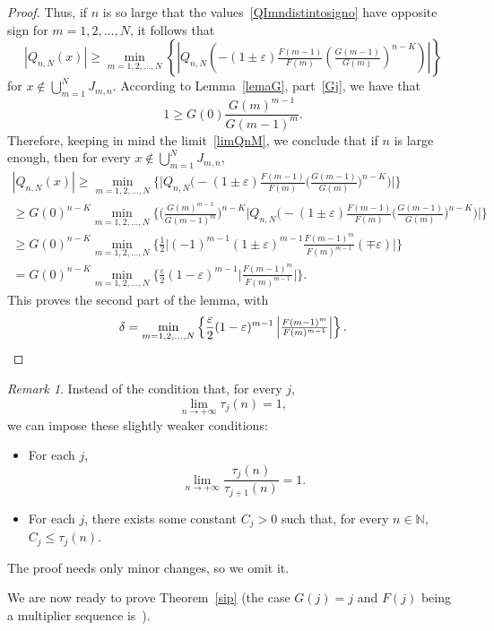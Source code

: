 \documentclass[10pt, a4paper, leqno]{amsart}
\numberwithin{equation}{section}
\theoremstyle{plain}
\theoremstyle{remark}
\newtheorem{Rem}{Remark}[section]
\newcommand{\NN}{\mathbb{N}}
\newcommand{\eps}{\varepsilon}
\begin{document}
\begin{proof}
Thus, if $n$ is so large that the values~\eqref{QImndistintosigno} have opposite sign for $m=1,2,\dots,N$, it follows that
\[
  |Q_{n,N}(x)| \ge \min_{m=1,2,\dots,N}\left\{
  \left|Q_{n,N}\left( -(1\pm \eps) \tfrac{F(m-1)}{F(m)} 
  \left( \tfrac{G(m-1)}{G(m)} \right)^{n-K} \right)\right|
  \right\}
\]
for $x \notin \bigcup_{m=1}^N J_{m,n}$. According to Lemma~\ref{lemaG}, part~\eqref{Gj},
we have that
\[
  1 \ge G(0) \frac{G(m)^{m-1}}{G(m-1)^m}.
\]
Therefore, keeping in mind the limit~\eqref{limQnM}, we conclude that if $n$ is large enough, then for every $x \notin \bigcup_{m=1}^N J_{m,n}$,
\begin{multline*}
  |Q_{n,N}(x)| \ge \min_{m=1,2,\dots,N}\Big\{
  \Big|Q_{n,N}\Big( -(1\pm \eps) \tfrac{F(m-1)}{F(m)} \Big( \tfrac{G(m-1)}{G(m)} \Big)^{n-K} \Big)\Big|
  \Big\}
  \\
  \ge G(0)^{n-K} \min_{m=1,2,\dots,N}\Big\{
  \Big( \tfrac{G(m)^{m-1}}{G(m-1)^m} \Big)^{n-K}
  \Big| Q_{n,N}\Big( -(1\pm \eps) \tfrac{F(m-1)}{F(m)} 
  \Big( \tfrac{G(m-1)}{G(m)} \Big)^{n-K} \Big)\Big|
  \Big\}
  \\
  \ge G(0)^{n-K} \min_{m=1,2,\dots,N}\Big\{
  \frac{1}{2} \Big|
  (-1)^{m-1} (1\pm \eps)^{m-1} \tfrac{F(m-1)^m}{F(m)^{m-1}}
  (\mp \eps)
  \Big|
  \Big\}
  \\
  = G(0)^{n-K} \min_{m=1,2,\dots,N} \Big\{ \frac{\eps}{2} (1 - \eps)^{m-1} 
  \Big|\tfrac{F(m-1)^m}{F(m)^{m-1}} \Big| \Big\}.
\end{multline*}
This proves the second part of the lemma, with
\[
  \delta = \min_{m=1,2,\dots,N} \left\{
  \frac{\eps}{2} (1 - \eps)^{m-1} \left|\tfrac{F(m-1)^m}{F(m)^{m-1}}\right|
  \right\}.
  \qedhere
\]
\end{proof}

\begin{Rem}
\label{taumenos}
Instead of the condition that, for every $j$,
\[
  \lim_{n \to +\infty} \tau_j(n) = 1,
\]
we can impose these slightly weaker conditions:
\begin{itemize}
\item For each $j$,
\[
  \lim_{n\to+\infty} \frac{\tau_j(n)}{\tau_{j+1}(n)} = 1.
\]
\item For each $j$, there exists some constant $C_j > 0$ such that, for every $n \in \NN$, $C_j \le \tau_j(n)$.
\end{itemize}
The proof needs only minor changes, so we omit it.
\end{Rem}

We are now ready to prove Theorem~\ref{sip} (the case $G(j)=j$ and $F(j)$ being a multiplier sequence is~\cite[Theorem~4]{dzb}).
\end{document}
